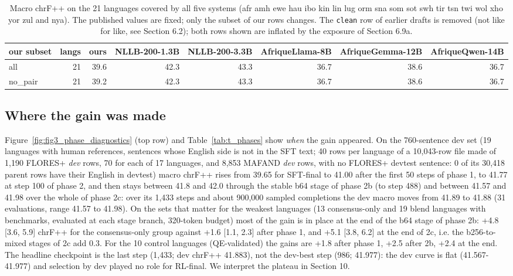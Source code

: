 \begin{table}[t]
\centering
\footnotesize
\setlength{\tabcolsep}{3pt}
\caption{Macro chrF++ on the 21 languages covered by all five systems (afr amh ewe hau ibo kin lin lug orm sna som sot swh tir tsn twi wol xho yor zul and nya). The published values are fixed; only the subset of our rows changes. The \texttt{clean} row of earlier drafts is removed (not like for like, see Section 6.2); both rows shown are inflated by the exposure of Section 6.9a.}
\label{tab:t_published21}
\begin{adjustbox}{max width=\linewidth}
{\def\LTcaptype{none} %
\begin{tabular}{@{}lrrrrrrr@{}}
\toprule
our subset & langs & ours & NLLB-200-1.3B & NLLB-200-3.3B & AfriqueLlama-8B & AfriqueGemma-12B & AfriqueQwen-14B \\
\midrule
all & 21 & 39.6 & 42.3 & 43.3 & 36.7 & 38.6 & 36.7 \\
no\_pair & 21 & 39.2 & 42.3 & 43.3 & 36.7 & 38.6 & 36.7 \\
\bottomrule
\end{tabular}
}
\end{adjustbox}
\end{table}

\subsection{Where the gain was made}\label{where-the-gain-was-made}

Figure~\ref{fig:fig3_phase_diagnostics} (top row) and Table~\ref{tab:t_phases} show \emph{when} the gain appeared. On the 760-sentence dev set (19 languages with human references, sentences whose English side is not in the SFT text; 40 rows per language of a 10,043-row file made of 1,190 FLORES+ \emph{dev} rows, 70 for each of 17 languages, and 8,853 MAFAND \emph{dev} rows, with no FLORES+ devtest sentence: 0 of its 30,418 parent rows have their English in devtest) macro chrF++ rises from 39.65 for SFT-final to 41.00 after the first 50 steps of phase 1, to 41.77 at step 100 of phase 2, and then stays between 41.8 and 42.0 through the stable b64 stage of phase 2b (to step 488) and between 41.57 and 41.98 over the whole of phase 2c: over its 1,433 steps and about 900,000 sampled completions the dev macro moves from 41.89 to 41.88 (31 evaluations, range 41.57 to 41.98). On the sets that matter for the weakest languages (13 consensus-only and 19 blend languages with benchmarks, evaluated at each stage branch, 320-token budget) most of the gain is in place at the end of the b64 stage of phase 2b: +4.8 {[}3.6, 5.9{]} chrF++ for the consensus-only group against +1.6 {[}1.1, 2.3{]} after phase 1, and +5.1 {[}3.8, 6.2{]} at the end of 2c, i.e. the b256-to-mixed stages of 2c add 0.3. For the 10 control languages (QE-validated) the gains are +1.8 after phase 1, +2.5 after 2b, +2.4 at the end. The headline checkpoint is the last step (1,433; dev chrF++ 41.883), not the dev-best step (986; 41.977): the dev curve is flat (41.567-41.977) and selection by dev played no role for RL-final. We interpret the plateau in Section 10.

